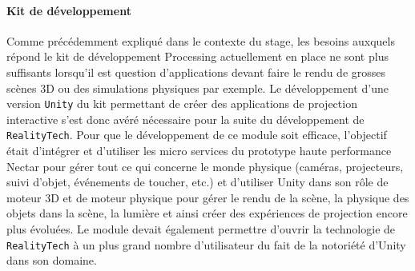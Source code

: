 \paragraph{Kit de développement} Comme précédemment expliqué dans le contexte du stage, les besoins auxquels répond le kit de développement Processing actuellement en place ne sont plus suffisants lorsqu'il est question d'applications devant faire le rendu de grosses scènes 3D ou des simulations physiques par exemple. Le développement d'une version \texttt{Unity} du kit permettant de créer des applications de projection interactive s'est donc avéré nécessaire pour la suite du développement de \texttt{RealityTech}. Pour que le développement de ce module soit efficace, l'objectif était d'intégrer et d'utiliser les micro services du prototype haute performance Nectar pour gérer tout ce qui concerne le monde physique (caméras, projecteurs, suivi d'objet, événements de toucher, etc.) et d'utiliser Unity dans son rôle de moteur 3D et de moteur physique pour gérer le rendu de la scène, la physique des objets dans la scène, la lumière et ainsi créer des expériences de projection encore plus évoluées. Le module devait également permettre d'ouvrir la technologie de \texttt{RealityTech} à un plus grand nombre d'utilisateur du fait de la notoriété d'Unity dans son domaine.
